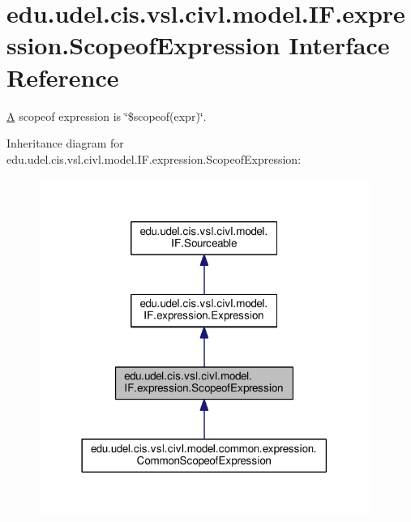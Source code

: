 \hypertarget{interfaceedu_1_1udel_1_1cis_1_1vsl_1_1civl_1_1model_1_1IF_1_1expression_1_1ScopeofExpression}{}\section{edu.\+udel.\+cis.\+vsl.\+civl.\+model.\+I\+F.\+expression.\+Scopeof\+Expression Interface Reference}
\label{interfaceedu_1_1udel_1_1cis_1_1vsl_1_1civl_1_1model_1_1IF_1_1expression_1_1ScopeofExpression}


\hyperlink{structA}{A} scopeof expression is \char`\"{}\$scopeof(expr)\char`\"{}.  




Inheritance diagram for edu.\+udel.\+cis.\+vsl.\+civl.\+model.\+I\+F.\+expression.\+Scopeof\+Expression\+:
\nopagebreak
\begin{figure}[H]
\begin{center}
\leavevmode
\includegraphics[width=306pt]{interfaceedu_1_1udel_1_1cis_1_1vsl_1_1civl_1_1model_1_1IF_1_1expression_1_1ScopeofExpression__inherit__graph}
\end{center}
\end{figure}


